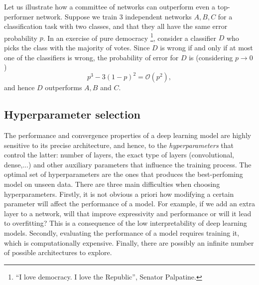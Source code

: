 Let us illustrate how a committee of networks can outperform even a top-performer network. Suppose we train 3 independent networks $A,B,C$ for a classification task with two classes, and that they all have the same error probability $p$. In an exercise of pure democracy \footnote{“I love democracy. I love the Republic”, Senator Palpatine.}, consider a classifier $D$ who picks the class with the majority of votes. Since $D$ is wrong if and only if at most one of the classifiers is wrong, the probability of error for $D$ is (considering $p\to 0$)
$$p^3-3(1-p)^2 =\mathcal{O}(p^2),$$
and hence $D$ outperforms $A,B$ and $C$.


\subsection{Hyperparameter selection}\label{sec:optuna}
The performance and convergence properties of a deep learning model are highly sensitive to its precise architecture, and hence, to the \emph{hyperparameters} that control the latter: number of layers, the exact type of layers (convolutional, dense,...) and other auxiliary parameters that influence the training process. The optimal set of hyperparameters are the ones that produces the best-perfoming model on unseen data. There are three main difficulties when choosing hyperparameters. Firstly, it is not obvious a priori how modifying a certain parameter will affect the performance of a model. For example, if we add an extra layer to a network, will that improve expressivity and performance or will it lead to overfitting? This is a consequence of the low interpretability of deep learning models. Secondly, evaluating the performance of a model requires training it, which is computationally expensive. Finally, there are possibly an infinite number of possible architectures to explore.

